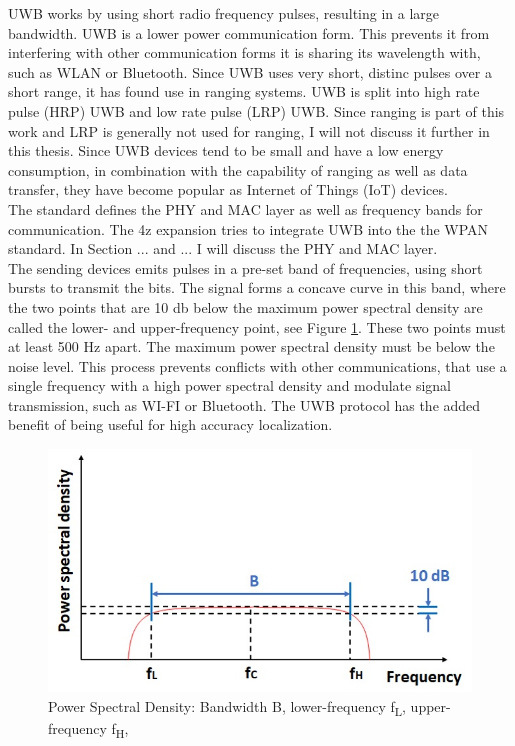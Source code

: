 UWB works by using short radio frequency pulses, resulting in a large bandwidth.
UWB is a lower power communication form.
This prevents it from interfering with other communication forms it is sharing its wavelength with, such as WLAN or Bluetooth. 
Since UWB uses very short, distinc pulses over a short range, it has found use in ranging systems. %
UWB is split into high rate pulse (HRP) UWB and low rate pulse (LRP) UWB.
Since ranging is part of this work and LRP is generally not used for ranging, I will not discuss it further in this thesis. %
Since UWB devices tend to be small and have a low energy consumption, in combination with the capability of ranging as well as data transfer, they have become popular as Internet of Things (IoT) devices. \\ 

The standard defines the PHY and MAC layer as well as frequency bands for communication.
The 4z expansion tries to integrate UWB into the the WPAN standard. In Section ... and ... I will discuss the PHY and MAC layer.\\

The sending devices emits pulses in a pre-set band of frequencies, using short bursts to transmit the bits.
The signal forms a concave curve in this band, where the two points that are 10 db below the maximum power spectral density are called the lower- and upper-frequency point, see Figure \ref{f:UWB_spectrum}.
These two points must at least 500 Hz apart.
The maximum power spectral density must be below the noise level.
This process prevents conflicts with other communications, that use a single frequency with a high power spectral density and modulate signal transmission, such as WI-FI or Bluetooth.
The UWB protocol has the added benefit of being useful for high accuracy localization.


\begin{figure}[ht!]
\centering
\includegraphics[width=\linewidth]{graphics/UWB_spectrum.jpg}
\caption{Power Spectral Density: Bandwidth B, lower-frequency f\textsubscript{L}, upper-frequency f\textsubscript{H}, \cite{hsu_2021}}
\label{f:UWB_spectrum}
\end{figure}


